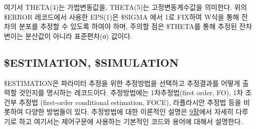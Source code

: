 \documentclass[
  11pt,
  krantz2,
  a4paper]{krantz}
\newenvironment{Shaded}{\begin{snugshade}}{\end{snugshade}}
\newcommand{\DecValTok}[1]{\textcolor[rgb]{0.00,0.00,0.81}{#1}}
\newcommand{\FloatTok}[1]{\textcolor[rgb]{0.00,0.00,0.81}{#1}}
\newcommand{\KeywordTok}[1]{\textcolor[rgb]{0.13,0.29,0.53}{\textbf{#1}}}
\newcommand{\NormalTok}[1]{#1}
\newcommand{\OperatorTok}[1]{\textcolor[rgb]{0.81,0.36,0.00}{\textbf{#1}}}
\newcommand{\StringTok}[1]{\textcolor[rgb]{0.31,0.60,0.02}{#1}}
\theoremstyle{definition}
\theoremstyle{definition}
\theoremstyle{definition}
\theoremstyle{remark}
\begin{document}
\begin{Shaded}
\end{Shaded}

여기서 THETA(4)는 가법변동값을, THETA(5)는 고정변동계수값을 의미한다. 위의 \$ERROR 레코드에서 사용한 EPS(1)은 \$SIGMA 에서 1로 FIX하여 W식을 통해 잔차의 분포를 추정할 수 있도록 하여야 하며, 주의할 점은 \$THETA를 통해 추정된 잔차변이는 분산값이 아니라 표준편차(σ) 값이다.

\hypertarget{estimation-simulation}{%
\subsection{\$ESTIMATION, \$SIMULATION}\label{estimation-simulation}}


\$ESTIMATION은 파라미터 추정을 위한 추정방법을 선택하고 추정결과를 어떻게 출력할 것인지를 명시하는 레코드이다. 추정방법에는 1차추정법(first order, FO), 1차 조건부 추정법 (first-order conditional estimation, FOCE), 라플라시안 추정법 등을 비롯하여 다양한 방법들이 있다. 추정방법에 대한 이론적인 설명은 \protect\hyperlink{estimation-methods}{9장}에서 자세히 다루기로 하고 여기서는 제어구문에 사용하는 기본적인 코드와 용어에 대해서 설명한다.
\end{document}
